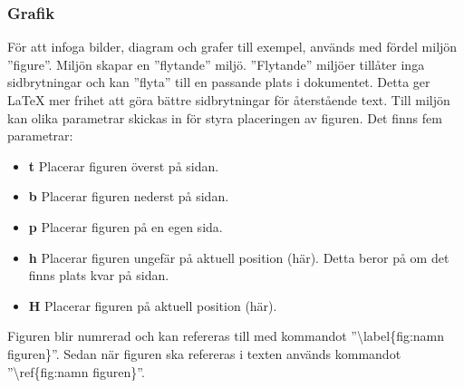\subsubsection{Grafik}
För att infoga bilder, diagram och grafer till exempel, används med fördel miljön ''figure''. Miljön skapar en ''flytande'' miljö. ''Flytande'' miljöer tillåter inga sidbrytningar och kan ''flyta'' till en passande plats i dokumentet. Detta ger {\LaTeX} mer frihet att göra bättre sidbrytningar för återstående text. Till miljön kan olika parametrar skickas in för styra placeringen av figuren. Det finns fem parametrar: 
\begin{itemize}
	\item \textbf{t} Placerar figuren överst på sidan.
	\item \textbf{b} Placerar figuren nederst på sidan.
	\item \textbf{p} Placerar figuren på en egen sida. 
	\item \textbf{h} Placerar figuren ungefär på aktuell position (här). Detta beror på om det finns plats kvar på sidan. 
	\item \textbf{H} Placerar figuren på aktuell position (här). 
\end{itemize}
Figuren blir numrerad och kan refereras till med kommandot ''\textbackslash label\{fig:namn figuren\}''. Sedan när figuren ska refereras i texten används kommandot ''\textbackslash ref\{fig:namn figuren\}''. 

